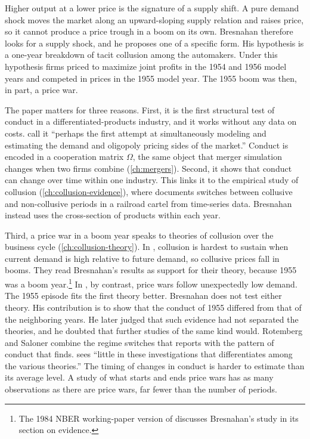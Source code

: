 Higher output at a lower price is the signature of a supply shift. A pure demand shock moves the market along an
upward-sloping supply relation and raises price, so it cannot produce a price trough in a boom on its own.
Bresnahan therefore looks for a supply shock, and he proposes one of a specific form. His hypothesis is a one-year
breakdown of tacit collusion among the automakers. Under this hypothesis firms priced to maximize joint profits in
the 1954 and 1956 model years and competed in prices in the 1955 model year. The 1955 boom was then, in part, a
price war.

The paper matters for three reasons. First, it is the first structural test of conduct in a differentiated-products
industry, and it works without any data on costs. \citet[p.~844]{BerryLevinsohnPakes1995} call it ``perhaps the
first attempt at simultaneously modeling and estimating the demand and oligopoly pricing sides of the market.''
Conduct is encoded in a cooperation matrix $\Omega$, the same object that merger simulation changes when two firms
combine (\cref{ch:mergers}). Second, it shows that conduct can change over time within one industry. This links it
to the empirical study of collusion (\cref{ch:collusion-evidence}), where \citet{Porter1983} documents switches
between collusive and non-collusive periods in a railroad cartel from time-series data. Bresnahan instead uses the
cross-section of products within each year.

Third, a price war in a boom year speaks to theories of collusion over the business cycle
(\cref{ch:collusion-theory}). In \citet{RotembergSaloner1986}, collusion is hardest to sustain when current demand
is high relative to future demand, so collusive prices fall in booms. They read Bresnahan's results as support for
their theory, because 1955 was a boom year.\footnote{The 1984 NBER working-paper version of
\citet{RotembergSaloner1986} discusses Bresnahan's study in its section on evidence.} In
\citet{GreenPorter1984}, by contrast, price wars follow unexpectedly low demand. The 1955 episode fits the first
theory better. Bresnahan does not test either theory. His contribution is to show that the conduct of 1955 differed
from that of the neighboring years. He later judged that such evidence had not separated the theories, and he doubted that further studies of the
same kind would. Rotemberg and
Saloner combine the regime switches that \citet{Porter1983} reports with the pattern of conduct that
\citet{Bresnahan1987} finds. \citet[p.~1025]{Bresnahan1989} sees ``little in these investigations that
differentiates among the various theories.'' The timing of changes in conduct is harder to estimate than its
average level. A study of what starts and ends price wars has as many observations as there are price wars, far
fewer than the number of periods.

